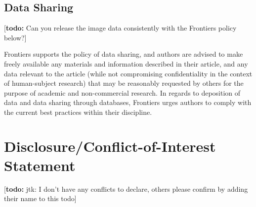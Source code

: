 \documentclass{frontiersSCNS} %
\newcommand{\todo}[1]{
  \rule{0pt}{0pt}\marginpar{{\color{blue}\rule{1ex}{1ex}}}
  {[\textbf{\color{blue}todo:} #1]}}
\begin{document}
\subsection{Data Sharing}

\todo{Can you release the image data consistently with the Frontiers
  policy below?}

Frontiers supports the policy of data sharing, and authors are advised
to make freely available any materials and information described in
their article, and any data relevant to the article (while not
compromising confidentiality in the context of human-subject research)
that may be reasonably requested by others for the purpose of academic
and non-commercial research. In regards to deposition of data and data
sharing through databases, Frontiers urges authors to comply with the
current best practices within their discipline.

\section*{Disclosure/Conflict-of-Interest Statement}

\todo{jtk: I don't have any conflicts to declare, others please
  confirm by adding their name to this todo}
\end{document}
